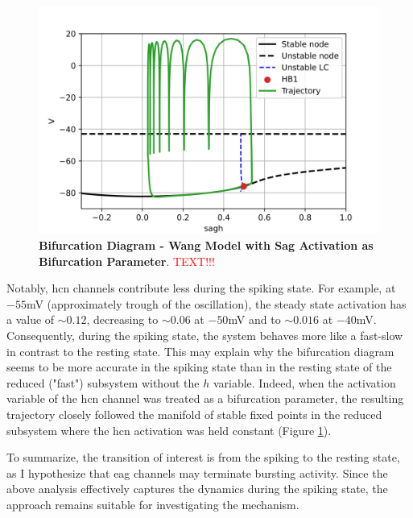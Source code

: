 \documentclass[../main.tex]{subfiles}
\begin{document}
\begin{figure}[!t]
    \centering
    \includegraphics[width=0.6\linewidth]{../img/spiking_to_bursting/bifurcation_wang_sagh.png}
    \caption[Bifurcation Diagram - Wang Model with Sag Activation as Bifurcation Parameter]{
        \textbf{Bifurcation Diagram - Wang Model with Sag Activation as Bifurcation Parameter}. \textcolor{red}{TEXT!!!}
    }
    \label{fig:spiking_to_bursting_wang_bifurcation_sagh}
\end{figure}

Notably, \gls{hcn} channels contribute less during the spiking state. For example, at $-55$mV (approximately trough of the oscillation), the steady state activation has a value of $\sim 0.12$, decreasing to $\sim 0.06$ at $-50$mV and to $\sim 0.016$ at $-40$mV. Consequently, during the spiking state, the system behaves more like a fast-slow in contrast to the resting state. This may explain why the bifurcation diagram seems to be more accurate in the spiking state than in the resting state of the reduced ("fast") subsystem without the $h$ variable. Indeed, when the activation variable of the \gls{hcn} channel was treated as a bifurcation parameter, the resulting trajectory closely followed the manifold of stable fixed points in the reduced subsystem where the \gls{hcn} activation was held constant (Figure \ref{fig:spiking_to_bursting_wang_bifurcation_sagh}).

To summarize, the transition of interest is from the spiking to the resting state, as I hypothesize that \gls{eag} channels may terminate bursting activity. Since the above analysis effectively captures the dynamics during the spiking state, the approach remains suitable for investigating the mechanism.
\end{document}
